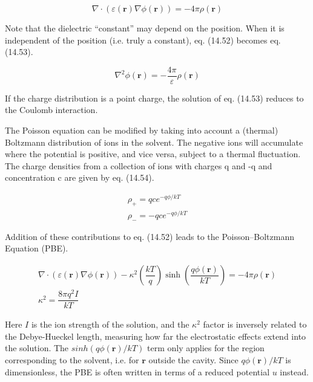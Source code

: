 \begin{equation}
\nabla\cdot(\varepsilon(\mathbf{r})\nabla\phi(\mathbf{r}))=-4\pi\rho(\mathbf{r})
\end{equation}


Note that the dielectric “constant” may depend on the position. When
it is independent of the position (i.e. truly a constant), eq. (14.52)
becomes eq. (14.53).

\begin{equation}
\nabla^{2}\phi(\mathbf{r})=-\frac{4\pi}{\varepsilon}\rho(\mathbf{r})
\end{equation}


If the charge distribution is a point charge, the solution of eq.
(14.53) reduces to the Coulomb interaction. 

The Poisson equation can be modified by taking into account a (thermal)
Boltzmann distribution of ions in the solvent. The negative ions will
accumulate where the potential is positive, and vice versa, subject
to a thermal fluctuation. The charge densities from a collection of
ions with charges q and -q and concentration c are given by eq. (14.54).

\begin{equation}
\begin{array}{c}
\rho_{+}=qce^{-q\phi/kT}\\
\rho_{-}=-qce^{-q\phi/kT}
\end{array}
\end{equation}


Addition of these contributions to eq. (14.52) leads to the Poisson–Boltzmann
Equation (PBE).

\begin{equation}
\begin{array}{r}
\nabla\cdot(\varepsilon(\mathbf{r})\nabla\phi(\mathbf{r}))-\kappa^{2}\left(\dfrac{kT}{q}\right)\sinh\left(\dfrac{q\phi(\mathbf{r})}{kT}\right)=-4\pi\rho(\mathbf{r})\\
\kappa^{2}=\dfrac{8\pi q^{2}I}{kT}
\end{array}
\end{equation}


Here $I$ is the ion strength of the solution, and the $\kappa^{2}$
factor is inversely related to the Debye-Hueckel length, measuring
how far the electrostatic effects extend into the solution. The $sinh(q\phi(\mathbf{r})/kT)$
term only applies for the region corresponding to the solvent, i.e.
for \textbf{$\mathbf{r}$} outside the cavity. Since $q\phi(\mathbf{r})/kT$
is dimensionless, the PBE is often written in terms of a reduced potential
$u$ instead.


